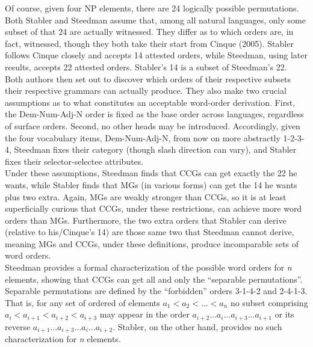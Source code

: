 \documentclass[12pt]{article}
\begin{document}
\noindent Of course, given four NP elements, there are 24 logically possible permutations. Both Stabler and Steedman assume that, among all natural languages, only some subset of that 24 are actually witnessed. They differ as to which orders are, in fact, witnessed, though they both take their start from Cinque (2005). Stabler follows Cinque closely and accepts 14 attested orders, while Steedman, using later results, accepts 22 attested orders. Stabler's 14 is a subset of Steedman's 22.\\

\noindent Both authors then set out to discover which orders of their respective subsets their respective grammars can actually produce. They also make two crucial assumptions as to what constitutes an acceptable word-order derivation. First, the Dem-Num-Adj-N order is fixed as the base order across languages, regardless of surface orders. Second, no other heads may be introduced. Accordingly, given the four vocabulary items, Dem-Num-Adj-N, from now on more abstractly 1-2-3-4, Steedman fixes their category (though slash direction can vary), and Stabler fixes their selector-selectee attributes.\\

\noindent Under these assumptions, Steedman finds that CCGs can get exactly the 22 he wants, while Stabler finds that MGs (in various forms) can get the 14 he wants plus two extra. Again, MGs are weakly stronger than CCGs, so it is at least superficially curious that CCGs, under these restrictions, can achieve more word orders than MGs. Furthermore, the two extra orders that Stabler can derive (relative to his/Cinque's 14) are those same two that Steedman cannot derive, meaning MGs and CCGs, under these definitions, produce incomparable sets of word orders.\\

\noindent Steedman provides a formal characterization of the possible word orders for \textit{n} elements, showing that CCGs can get all and only the ``separable permutations''. Separable permutations are defined by the ``forbidden'' orders 3-1-4-2 and  2-4-1-3. That is, for any set of ordered of elements $a_1 < a_2 < ... < a_n$ no subset comprising $a_i < a_{i+1} < a_{i+2} < a_{i+3}$ may appear in the order $a_{i+2} ... a_i ... a_{i+3} ... a_{i+1}$ or its reverse $a_{i+1} ... a_{i+3} ... a_i ... a_{i+2}$. Stabler, on the other hand, provides no such characterization for \textit{n} elements.\\
\end{document}
